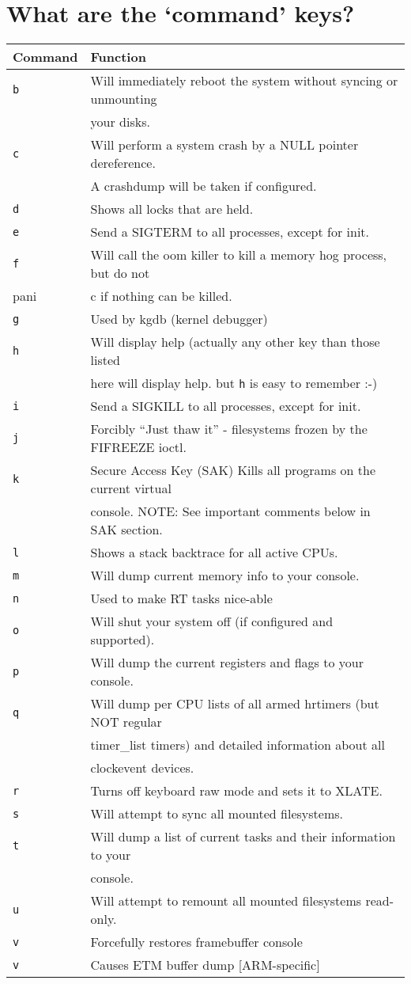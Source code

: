 \documentclass[article,letterpaper]{memoir}
\let\subsection\section
\let\section\chapter
\begin{document}
\subsection{\texorpdfstring{What are the `command'
keys?}{What are the command keys?}}\label{what-are-the-command-keys}

\begin{longtable}[]{@{}ll@{}}
\toprule
Command & Function\tabularnewline
\midrule
\endhead
\texttt{b} & Will immediately reboot the system without syncing or
unmounting\tabularnewline
& your disks.\tabularnewline
\texttt{c} & Will perform a system crash by a NULL pointer
dereference.\tabularnewline
& A crashdump will be taken if configured.\tabularnewline
\texttt{d} & Shows all locks that are held.\tabularnewline
\texttt{e} & Send a SIGTERM to all processes, except for
init.\tabularnewline
\texttt{f} & Will call the oom killer to kill a memory hog process, but
do not\tabularnewline
pani & c if nothing can be killed.\tabularnewline
\texttt{g} & Used by kgdb (kernel debugger)\tabularnewline
\texttt{h} & Will display help (actually any other key than those
listed\tabularnewline
& here will display help. but \texttt{h} is easy to remember
:-)\tabularnewline
\texttt{i} & Send a SIGKILL to all processes, except for
init.\tabularnewline
\texttt{j} & Forcibly ``Just thaw it'' - filesystems frozen by the
FIFREEZE ioctl.\tabularnewline
\texttt{k} & Secure Access Key (SAK) Kills all programs on the current
virtual\tabularnewline
& console. NOTE: See important comments below in SAK
section.\tabularnewline
\texttt{l} & Shows a stack backtrace for all active CPUs.\tabularnewline
\texttt{m} & Will dump current memory info to your
console.\tabularnewline
\texttt{n} & Used to make RT tasks nice-able\tabularnewline
\texttt{o} & Will shut your system off (if configured and
supported).\tabularnewline
\texttt{p} & Will dump the current registers and flags to your
console.\tabularnewline
\texttt{q} & Will dump per CPU lists of all armed hrtimers (but NOT
regular\tabularnewline
& timer\_list timers) and detailed information about all\tabularnewline
& clockevent devices.\tabularnewline
\texttt{r} & Turns off keyboard raw mode and sets it to
XLATE.\tabularnewline
\texttt{s} & Will attempt to sync all mounted
filesystems.\tabularnewline
\texttt{t} & Will dump a list of current tasks and their information to
your\tabularnewline
& console.\tabularnewline
\texttt{u} & Will attempt to remount all mounted filesystems
read-only.\tabularnewline
\texttt{v} & Forcefully restores framebuffer console\tabularnewline
\texttt{v} & Causes ETM buffer dump {[}ARM-specific{]}\tabularnewline

\end{longtable}
\end{document}
